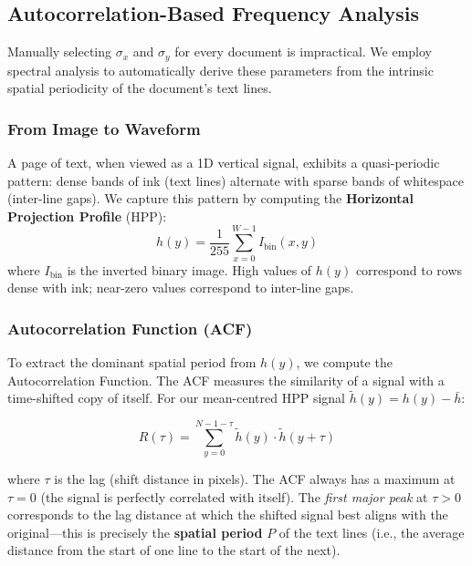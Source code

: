 \documentclass[12pt, a4paper]{article}
\begin{document}
\subsection{Autocorrelation-Based Frequency Analysis}

Manually selecting $\sigma_x$ and $\sigma_y$ for every document is impractical. We employ spectral analysis to automatically derive these parameters from the intrinsic spatial periodicity of the document's text lines.

\subsubsection{From Image to Waveform}

A page of text, when viewed as a 1D vertical signal, exhibits a quasi-periodic pattern: dense bands of ink (text lines) alternate with sparse bands of whitespace (inter-line gaps). We capture this pattern by computing the \textbf{Horizontal Projection Profile} (HPP):
\begin{equation}
    h(y) = \frac{1}{255} \sum_{x=0}^{W-1} I_{\text{bin}}(x, y)
    \label{eq:hpp}
\end{equation}
where $I_{\text{bin}}$ is the inverted binary image. High values of $h(y)$ correspond to rows dense with ink; near-zero values correspond to inter-line gaps.

\subsubsection{Autocorrelation Function (ACF)}

To extract the dominant spatial period from $h(y)$, we compute the Autocorrelation Function. The ACF measures the similarity of a signal with a time-shifted copy of itself. For our mean-centred HPP signal $\tilde{h}(y) = h(y) - \bar{h}$:

\begin{equation}
    R(\tau) = \sum_{y=0}^{N-1-\tau} \tilde{h}(y) \cdot \tilde{h}(y + \tau)
    \label{eq:acf}
\end{equation}

where $\tau$ is the lag (shift distance in pixels). The ACF always has a maximum at $\tau = 0$ (the signal is perfectly correlated with itself). The \emph{first major peak} at $\tau > 0$ corresponds to the lag distance at which the shifted signal best aligns with the original---this is precisely the \textbf{spatial period} $P$ of the text lines (i.e., the average distance from the start of one line to the start of the next).
\end{document}
